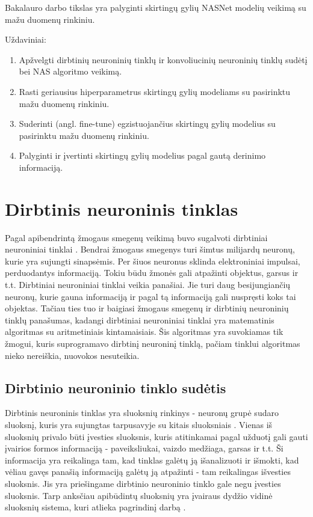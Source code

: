 \documentclass{VUMIFPSbakalaurinis}
\begin{document}
Bakalauro darbo tikslas yra palyginti skirtingų gylių NASNet modelių veikimą su mažu duomenų rinkiniu.

Uždaviniai:
\begin{enumerate}
    \item Apžvelgti dirbtinių neuroninių tinklų ir konvoliucinių neuroninių tinklų sudėtį bei NAS algoritmo veikimą.
    \item Rasti geriausius hiperparametrus skirtingų gylių modeliams su pasirinktu mažu duomenų rinkiniu.
    \item Suderinti (angl. fine-tune) egzistuojančius skirtingų gylių modelius su pasirinktu mažu duomenų rinkiniu.
    \item Palyginti ir įvertinti skirtingų gylių modelius pagal gautą derinimo informaciją.
\end{enumerate}

\section{Dirbtinis neuroninis tinklas}
Pagal apibendrintą žmogaus smegenų veikimą buvo sugalvoti dirbtiniai neuroniniai tinklai \cite{Goodfellow-et-al-2016}. Bendrai žmogaus smegenys turi šimtus
milijardų neuronų, kurie yra sujungti sinapsėmis. Per šiuos neuronus sklinda elektroniniai impulsai, perduodantys informaciją. Tokiu būdu žmonės gali 
atpažinti objektus, garsus ir t.t. Dirbtiniai neuroniniai tinklai veikia panašiai. Jie turi daug besijungiančių neuronų, kurie gauna informaciją ir 
pagal tą informaciją gali nuspręsti koks tai objektas. Tačiau ties tuo ir baigiasi žmogaus smegenų ir dirbtinių neuroninių tinklų panašumas, 
kadangi dirbtiniai neuroniniai tinklai yra matematinis algoritmas su aritmetiniais kintamaisiais. Šis algoritmas yra suvokiamas 
tik žmogui, kuris suprogramavo dirbtinį neuroninį tinklą, pačiam tinklui algoritmas nieko nereiškia, nuovokos nesuteikia.

\subsection{Dirbtinio neuroninio tinklo sudėtis}
Dirbtinis neuroninis tinklas yra sluoksnių rinkinys - neuronų grupė sudaro sluoksnį, kuris yra sujungtas tarpusavyje su kitais sluoksniais \cite{1193152}. Vienas iš
sluoksnių privalo būti įvesties sluoksnis, kuris atitinkamai pagal užduotį gali gauti įvairios formos informaciją - paveiksliukai, vaizdo
medžiaga, garsas ir t.t. Ši informacija yra reikalinga tam, kad tinklas galėtų ją išanalizuoti ir išmokti, kad vėliau gavęs panašią
informaciją galėtų ją atpažinti - tam reikalingas išvesties sluoksnis. Jis yra priešingame dirbtinio neuroninio tinklo gale negu įvesties sluoksnis.
Tarp anksčiau apibūdintų sluoksnių yra įvairaus dydžio vidinė sluoksnių sistema, kuri atlieka pagrindinį darbą \cite{Woodford-2018}.
\end{document}
